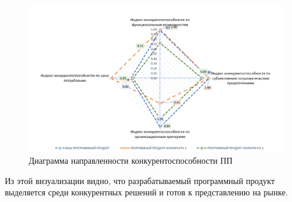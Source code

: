 \begin{figure}[H]   
	\centering
	\includegraphics[width=\textwidth]{images/ec_competitive_chart.png}
	\parskip=6pt
	\caption{Диаграмма направленности конкурентоспособности ПП}
	\label{fig:competitive}
\end{figure}

Из этой визуализации видно, что разрабатываемый программный продукт выделяется среди конкурентных решений и готов к представлению на рынке.